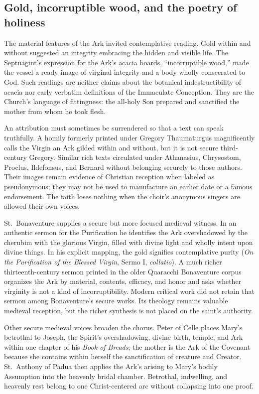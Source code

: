 \subsection{Gold, incorruptible wood, and the poetry of holiness}

The material features of the Ark invited contemplative reading. Gold within
and without suggested an integrity embracing the hidden and visible life.
The Septuagint's expression for the Ark's acacia boards, ``incorruptible
wood,'' made the vessel a ready image of virginal integrity and a body wholly
consecrated to God. Such readings are neither claims about the botanical
indestructibility of acacia nor early verbatim definitions of the Immaculate
Conception. They are the Church's language of fittingness: the all-holy Son
prepared and sanctified the mother from whom he took flesh.

An attribution must sometimes be surrendered so that a text can speak truthfully.
A homily formerly printed under Gregory Thaumaturgus magnificently calls the
Virgin an Ark gilded within and without, but it is not secure third-century
Gregory. Similar rich texts circulated under Athanasius, Chrysostom, Proclus,
Ildefonsus, and Bernard without belonging securely to those authors. Their
images remain evidence of Christian reception when labeled as pseudonymous;
they may not be used to manufacture an earlier date or a famous endorsement.
The faith loses nothing when the choir's anonymous singers are allowed their
own voices.

St.~Bonaventure supplies a secure but more focused medieval witness. In an
authentic sermon for the Purification he identifies the Ark overshadowed by the
cherubim with the glorious Virgin, filled with divine light and wholly intent
upon divine things. In his explicit mapping, the gold signifies contemplative
purity (\emph{On the Purification of the Blessed Virgin}, Sermo I,
\emph{collatio}). A much richer thirteenth-century sermon printed in the older
Quaracchi Bonaventure corpus organizes the Ark by material, contents, efficacy,
and honor and asks whether virginity is not a kind of incorruptibility. Modern
critical work did not retain that sermon among Bonaventure's secure works. Its
theology remains valuable medieval reception, but the richer synthesis is not
placed on the saint's authority.

Other secure medieval voices broaden the chorus. Peter of Celle places Mary's
betrothal to Joseph, the Spirit's overshadowing, divine birth, temple, and Ark
within one chapter of his \emph{Book of Breads}; the mother is the Ark of the
Covenant because she contains within herself the sanctification of creature
and Creator. St.~Anthony of Padua
then applies the Ark's arising to Mary's bodily Assumption into the heavenly
bridal chamber. Betrothal, indwelling, and heavenly rest belong to one
Christ-centered arc without collapsing into one proof.

